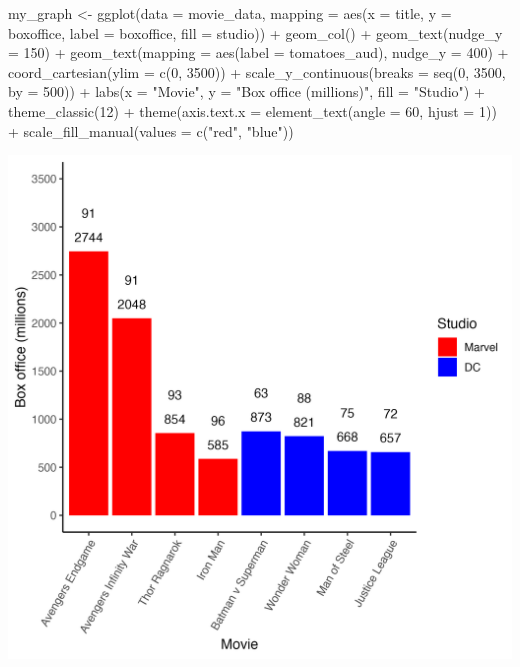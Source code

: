 \documentclass[
]{krantz}
\makeatletter
\newenvironment{Shaded}{\begin{snugshade}}{\end{snugshade}}
\newcommand{\AttributeTok}[1]{\textcolor[rgb]{0.61,0.61,0.61}{#1}}
\newcommand{\DecValTok}[1]{\textcolor[rgb]{0.06,0.06,0.06}{#1}}
\newcommand{\FunctionTok}[1]{\textcolor[rgb]{0,0,0}{#1}}
\newcommand{\NormalTok}[1]{#1}
\newcommand{\OtherTok}[1]{\textcolor[rgb]{0.37,0.37,0.37}{#1}}
\newcommand{\SpecialCharTok}[1]{\textcolor[rgb]{0,0,0}{#1}}
\newcommand{\StringTok}[1]{\textcolor[rgb]{0.5,0.5,0.5}{#1}}
\newenvironment{kframe}{%
\medskip{}
\setlength{\fboxsep}{.8em}
 \def\at@end@of@kframe{}%
 \ifinner\ifhmode%
  \def\at@end@of@kframe{\end{minipage}}%
  \begin{minipage}{\columnwidth}%
 \fi\fi%
 \def\FrameCommand##1{\hskip\@totalleftmargin \hskip-\fboxsep
 \colorbox{shadecolor}{##1}\hskip-\fboxsep
     \hskip-\linewidth \hskip-\@totalleftmargin \hskip\columnwidth}%
 \MakeFramed {\advance\hsize-\width
   \@totalleftmargin\z@ \linewidth\hsize
   \@setminipage}}%
 {\par\unskip\endMakeFramed%
 \at@end@of@kframe}
\renewenvironment{Shaded}{\begin{kframe}}{\end{kframe}}
\makeatother
\begin{document}
\begin{Shaded}
\begin{Highlighting}[]
\NormalTok{my\_graph }\OtherTok{\textless{}{-}} \FunctionTok{ggplot}\NormalTok{(}\AttributeTok{data =}\NormalTok{ movie\_data,}
           \AttributeTok{mapping =} \FunctionTok{aes}\NormalTok{(}\AttributeTok{x =}\NormalTok{ title,}
                         \AttributeTok{y =}\NormalTok{ boxoffice,}
                         \AttributeTok{label =}\NormalTok{ boxoffice, }
                         \AttributeTok{fill =}\NormalTok{ studio)) }\SpecialCharTok{+}
  \FunctionTok{geom\_col}\NormalTok{() }\SpecialCharTok{+}
  \FunctionTok{geom\_text}\NormalTok{(}\AttributeTok{nudge\_y =} \DecValTok{150}\NormalTok{)  }\SpecialCharTok{+}
  \FunctionTok{geom\_text}\NormalTok{(}\AttributeTok{mapping =} \FunctionTok{aes}\NormalTok{(}\AttributeTok{label =}\NormalTok{ tomatoes\_aud), }
            \AttributeTok{nudge\_y =} \DecValTok{400}\NormalTok{) }\SpecialCharTok{+}
  \FunctionTok{coord\_cartesian}\NormalTok{(}\AttributeTok{ylim =} \FunctionTok{c}\NormalTok{(}\DecValTok{0}\NormalTok{, }\DecValTok{3500}\NormalTok{)) }\SpecialCharTok{+}
  \FunctionTok{scale\_y\_continuous}\NormalTok{(}\AttributeTok{breaks =} \FunctionTok{seq}\NormalTok{(}\DecValTok{0}\NormalTok{, }\DecValTok{3500}\NormalTok{, }\AttributeTok{by =} \DecValTok{500}\NormalTok{)) }\SpecialCharTok{+}
  \FunctionTok{labs}\NormalTok{(}\AttributeTok{x =} \StringTok{"Movie"}\NormalTok{,}
       \AttributeTok{y =} \StringTok{"Box office (millions)"}\NormalTok{,}
       \AttributeTok{fill =} \StringTok{"Studio"}\NormalTok{) }\SpecialCharTok{+}
  \FunctionTok{theme\_classic}\NormalTok{(}\DecValTok{12}\NormalTok{) }\SpecialCharTok{+}
  \FunctionTok{theme}\NormalTok{(}\AttributeTok{axis.text.x =} \FunctionTok{element\_text}\NormalTok{(}\AttributeTok{angle =} \DecValTok{60}\NormalTok{, }
                                   \AttributeTok{hjust =} \DecValTok{1}\NormalTok{)) }\SpecialCharTok{+}
  \FunctionTok{scale\_fill\_manual}\NormalTok{(}\AttributeTok{values =} \FunctionTok{c}\NormalTok{(}\StringTok{"red"}\NormalTok{, }\StringTok{"blue"}\NormalTok{))}
\end{Highlighting}
\end{Shaded}

\includegraphics[width=0.65\linewidth]{ch_graphing/images/base_color_graph}
\end{document}
